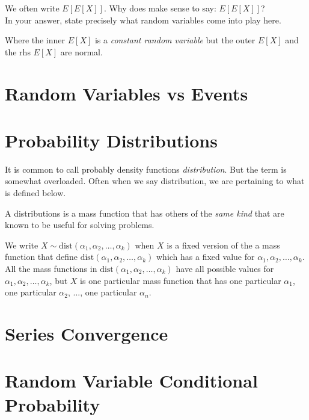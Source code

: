 \frmrule

\begin{example}
We often write $E[E[X]]$. Why does make sense to say: $E[E[X]]$? \\
In your answer, state precisely what random variables come into play here.
\end{example}

\frmrule

Where the inner $E[X]$ is a \textit{constant random variable} but the 
outer $E[X]$ and the rhs $E[X]$ are normal. 

\frmrule


\section{Random Variables vs Events}


\section{Probability Distributions}

It is common to call probably density functions \textit{distribution}. 
But the term is somewhat overloaded. Often when we 
say distribution, we are pertaining to what is defined below.


A distributions is a mass function that has others of the \textit{same kind} that are known 
to be useful for solving problems. 

We write $X \sim \text{dist}(\alpha_1, \alpha_2, \ldots, \alpha_k)$ 
when $X$ is a fixed version of the a mass function that define $\text{dist}(\alpha_1, \alpha_2, \ldots, \alpha_k)$ 
which has a fixed value for $\alpha_1, \alpha_2, \ldots, \alpha_k$. 
All the mass functions in $\text{dist}(\alpha_1, \alpha_2, \ldots, \alpha_k)$ 
have all possible values for $\alpha_1, \alpha_2, \ldots, \alpha_k$, but 
$X$ is one particular mass function that has one particular $\alpha_1$, one particular $\alpha_2$, 
..., one particular $\alpha_n$.


\section{Series Convergence}





\section{Random Variable Conditional Probability}
